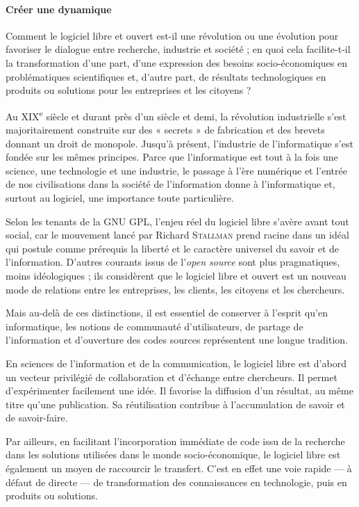 \paragraph{Créer une dynamique}
Comment le logiciel libre et ouvert est-il une révolution ou une évolution pour favoriser le dialogue entre recherche, industrie et société ; en quoi cela facilite-t-il la transformation d'une part, d'une expression des besoins socio-économiques en problématiques scientifiques et, d'autre part, de résultats technologiques en produits ou solutions pour les entreprises et les citoyens ?

Au XIX\textsuperscript{e} siècle et durant près d'un siècle et demi, la révolution in\-dustrielle s'est majoritairement construite sur des « secrets » de fabrication et des brevets donnant un droit de monopole. Jusqu'à présent, l'industrie de l'informatique s'est fondée sur les mêmes principes. Parce que l'informatique est tout à la fois une science, une technologie et une industrie, le passage à l'ère numérique et l'entrée de nos civilisations dans la société de l'information donne à l'informatique et, surtout au logiciel, une importance toute particulière.

Selon les tenants de la GNU GPL, l'enjeu réel du logiciel libre s'avère avant tout social, car le mouvement lancé par Richard \textsc{Stallman} prend racine dans un idéal qui postule comme prérequis la liberté et le caractère universel du savoir et de l'information. D'autres courants issus de l'\textit{open source} sont plus pragmatiques, moins idéologiques ; ils considèrent que le logiciel libre et ouvert est un nouveau mode de relations entre les entreprises, les clients, les citoyens et les chercheurs.

Mais au-delà de ces distinctions, il est essentiel de conserver à l'esprit qu'en informatique, les notions de communauté d'utilisateurs, de partage de l'information et d'ouverture des codes sources représentent une longue tradition.


En sciences de l'information et de la communication, le logiciel libre est d'abord un vecteur privilégié de collaboration et d'échange entre chercheurs. Il permet d'expérimenter facilement une idée. Il favorise la diffusion d'un résultat, au même titre qu'une publication. Sa réutilisation contribue à l'accumulation de savoir et de savoir-faire.

Par ailleurs, en facilitant l'incorporation immédiate de code issu de la recherche dans les solutions utilisées dans le monde socio-économi\-que, le logiciel libre est également un moyen de raccourcir le transfert. C'est en effet une voie rapide --- à défaut de directe --- de transformation des connaissances en technologie, puis en produits ou solutions.

